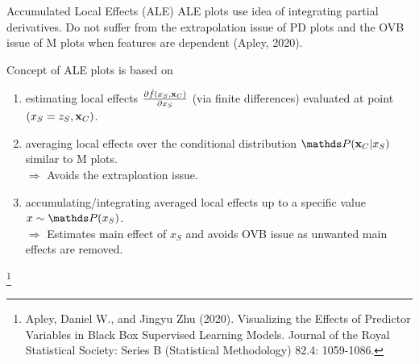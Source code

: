 \documentclass[11pt,compress,t,notes=noshow, aspectratio=169, xcolor=table]{beamer}
\begin{document}
\begin{frame}{Accumulated Local Effects (ALE)}
ALE plots use idea of integrating partial derivatives. Do not suffer from the extrapolation issue of PD plots and the OVB issue of M plots when features are dependent (Apley, 2020).

\lz
Concept of ALE plots is based on
\begin{enumerate}
\item estimating local effects $\frac{\partial \fh(x_S, \xv_C)}{\partial x_S}$ (via finite differences) evaluated at point $(x_S = z_S, \xv_C)$.
\item averaging local effects over the conditional distribution $\P(\xv_C|x_S)$ similar to M plots.\\ %
$\Rightarrow$ Avoids the extraploation issue.
\item accumulating/integrating averaged local effects up to a specific value $x \sim \P(x_S)$.\\ %
$\Rightarrow$ Estimates main effect of $x_S$ and avoids OVB issue as unwanted main effects are removed.
\end{enumerate}

\footnote[frame]{Apley, Daniel W., and Jingyu Zhu (2020). Visualizing the Effects of Predictor Variables in Black Box Supervised Learning Models. Journal of the Royal Statistical Society: Series B (Statistical Methodology) 82.4: 1059-1086.}
\end{frame}
\end{document}
